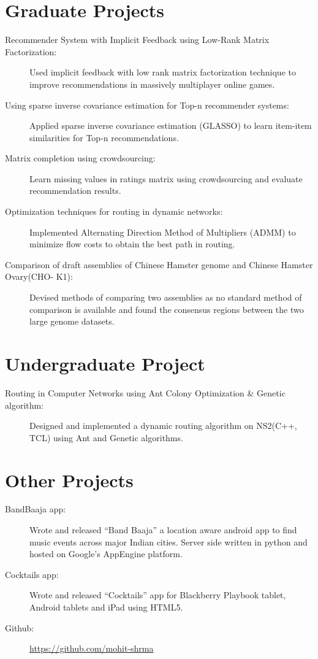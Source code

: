 \documentclass[a4paper,10pt]{article}
\begin{document}
\section{Graduate Projects}
\begin{description}
  \item[Recommender System with Implicit Feedback using Low-Rank Matrix
    Factorization:] Used implicit feedback with low rank matrix factorization
    technique to improve recommendations in massively multiplayer online games.
  \item[Using sparse inverse covariance estimation for Top-n recommender
    systems:] Applied sparse inverse covariance estimation (GLASSO) to learn item-item
    similarities for Top-n recommendations.
  \item[Matrix completion using crowdsourcing:] Learn missing values
    in ratings matrix using crowdsourcing  and evaluate recommendation results.
  \item[Optimization techniques for routing in dynamic networks:] Implemented
    Alternating Direction Method of Multipliers (ADMM) to minimize flow costs to obtain
    the best path in routing.
  \item[Comparison of draft assemblies of Chinese Hamster genome and Chinese
    Hamster Ovary(CHO- K1):] Devised methods of comparing two assemblies as no
    standard method of comparison is available and found the consensus regions
    between the two large genome datasets.
\end{description}

\section{Undergraduate Project}
\begin{description}
  \item[Routing in Computer Networks using Ant Colony Optimization \& Genetic algorithm:] Designed and implemented a dynamic routing algorithm on NS2(C++,
  TCL) using Ant and Genetic algorithms.  
\end{description}

\section{Other Projects}
\begin{description}
  \item[BandBaaja app:] Wrote and released “Band Baaja” a location
    aware android app to find music events across major Indian cities. Server
    side written in python and hosted on Google’s AppEngine platform. 
  \item[Cocktails app:] Wrote and released “Cocktails” app for Blackberry
    Playbook tablet, Android tablets and iPad using HTML5.
  \item[Github:] \url{https://github.com/mohit-shrma}  
\end{description}



\end{document}
